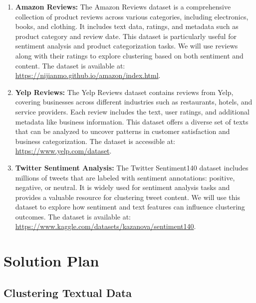 \documentclass[11pt]{article}
\begin{document}
\begin{enumerate}
    \item \textbf{Amazon Reviews:}  
    The Amazon Reviews dataset is a comprehensive collection of product reviews across various categories, including electronics, books, and clothing. It includes text data, ratings, and metadata such as product category and review date. This dataset is particularly useful for sentiment analysis and product categorization tasks. We will use reviews along with their ratings to explore clustering based on both sentiment and content. The dataset is available at: \url{https://nijianmo.github.io/amazon/index.html}.

    \item \textbf{Yelp Reviews:}  
    The Yelp Reviews dataset contains reviews from Yelp, covering businesses across different industries such as restaurants, hotels, and service providers. Each review includes the text, user ratings, and additional metadata like business information. This dataset offers a diverse set of texts that can be analyzed to uncover patterns in customer satisfaction and business categorization. The dataset is accessible at: \url{https://www.yelp.com/dataset}.
    
    \item \textbf{Twitter Sentiment Analysis:}  
    The Twitter Sentiment140 dataset includes millions of tweets that are labeled with sentiment annotations: positive, negative, or neutral. It is widely used for sentiment analysis tasks and provides a valuable resource for clustering tweet content. We will use this dataset to explore how sentiment and text features can influence clustering outcomes. The dataset is available at: \url{https://www.kaggle.com/datasets/kazanova/sentiment140}.
\end{enumerate}


\section{Solution Plan}
\subsection{Clustering Textual Data}
\end{document}
